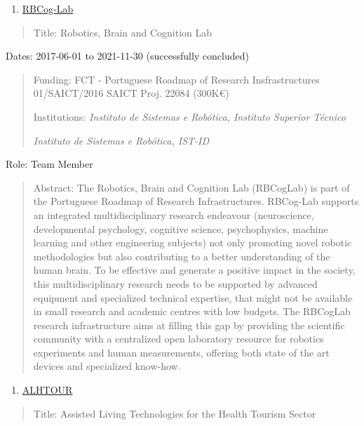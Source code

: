 \begin{enumerate}
\def\labelenumi{\arabic{enumi}.}
\setcounter{enumi}{4}
\item
  \ul{RBCog-Lab}
\end{enumerate}

\begin{quote}
Title: Robotics, Brain and Cognition Lab
\end{quote}

Dates: 2017-06-01 to 2021-11-30 (successfully concluded)

\begin{quote}
Funding: FCT - Portuguese Roadmap of Research Insfrastructures
01/SAICT/2016 SAICT Proj. 22084 (300K€)

Institutions: \emph{Instituto de Sistemas e Robótica, Instituto Superior
Técnico}

\emph{Instituto de Sistemas e Robótica, IST-ID}
\end{quote}

Role: Team Member

\begin{quote}
Abstract: The Robotics, Brain and Cognition Lab (RBCogLab) is part of
the Portuguese Roadmap of Research Infrastructures. RBCog-Lab supports
an integrated multidisciplinary research endeavour (neuroscience,
developmental psychology, cognitive science, psychophysics, machine
learning and other engineering subjects) not only promoting novel
robotic methodologies but also contributing to a better understanding of
the human brain. To be effective and generate a positive impact in the
society, this multidisciplinary research needs to be supported by
advanced equipment and specialized technical expertise, that might not
be available in small research and academic centres with low budgets.
The RBCogLab research infrastructure aims at filling this gap by
providing the scientific community with a centralized open laboratory
resource for robotics experiments and human measurements, offering both
state of the art devices and specialized know-how.
\end{quote}

\begin{enumerate}
\def\labelenumi{\arabic{enumi}.}
\setcounter{enumi}{5}
\item
  \ul{ALHTOUR}
\end{enumerate}

\begin{quote}
Title: Assisted Living Technologies for the Health Tourism Sector
\end{quote}

